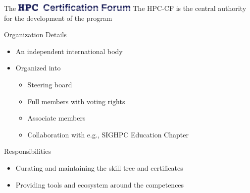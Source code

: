\documentclass[compress,aspectratio=169]{beamer}
\begin{document}
\begin{frame}{The \includegraphics[width=0.45\textwidth]{hpccf-full}}
	The HPC-CF is the central authority for the development of the program

	\begin{block}{Organization Details}
		\begin{itemize}
			\item An independent international body
			\item Organized into
				\begin{itemize}
					\item Steering board
					\item Full members with voting rights
					\item Associate members
          \item Collaboration with e.g., SIGHPC Education Chapter
				\end{itemize}
		\end{itemize}
	\end{block}

	\begin{block}{Responsibilities}
		\begin{itemize}
			\item Curating and maintaining the skill tree and certificates
			\item Providing tools and ecosystem around the competences
		\end{itemize}
	\end{block}
\end{frame}
\end{document}
